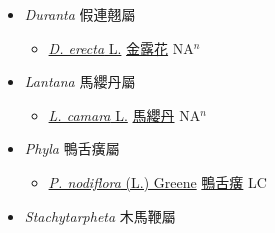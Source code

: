 
  \begin{itemize}
 \item[] \textit{Duranta} 假連翹屬
                    
  \begin{itemize}
        \item[] \href{http://www.theplantlist.org/tpl1.1/search?q=Duranta+erecta}{\textit{D. erecta} L.}   \href{\detokenize{http://taibnet.sinica.edu.tw/chi/taibnet_species_list.php?T2=金露花&T2_new_value=true&fr=y}}{金露花} NA$^n$
  \end{itemize}
 \item[] \textit{Lantana} 馬纓丹屬
                    
  \begin{itemize}
        \item[] \href{http://www.theplantlist.org/tpl1.1/search?q=Lantana+camara}{\textit{L. camara} L.}   \href{\detokenize{http://taibnet.sinica.edu.tw/chi/taibnet_species_list.php?T2=馬纓丹&T2_new_value=true&fr=y}}{馬纓丹} NA$^n$
  \end{itemize}
 \item[] \textit{Phyla} 鴨舌癀屬
                    
  \begin{itemize}
        \item[] \href{http://www.theplantlist.org/tpl1.1/search?q=Phyla+nodiflora}{\textit{P. nodiflora} (L.) Greene}   \href{\detokenize{http://taibnet.sinica.edu.tw/chi/taibnet_species_list.php?T2=鴨舌癀&T2_new_value=true&fr=y}}{鴨舌癀} LC
  \end{itemize}
 \item[] \textit{Stachytarpheta} 木馬鞭屬
                    

\end{itemize}
